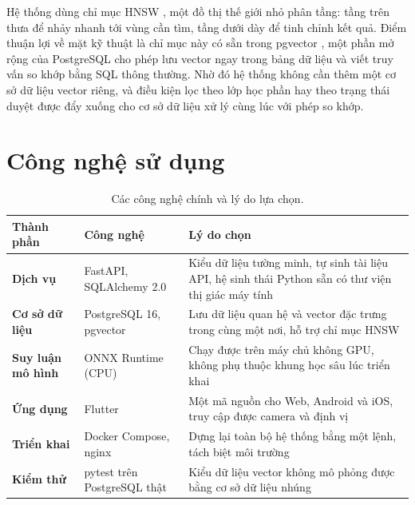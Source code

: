 Hệ thống dùng chỉ mục HNSW \cite{Malkov2020HNSW}, một đồ thị thế giới nhỏ
phân tầng: tầng trên thưa để nhảy nhanh tới vùng cần tìm, tầng dưới dày để
tinh chỉnh kết quả. Điểm thuận lợi về mặt kỹ thuật là chỉ mục này có sẵn
trong pgvector \cite{Pgvector2024}, một phần mở rộng của PostgreSQL cho phép
lưu vector ngay trong bảng dữ liệu và viết truy vấn so khớp bằng SQL thông
thường. Nhờ đó hệ thống không cần thêm một cơ sở dữ liệu vector riêng, và
điều kiện lọc theo lớp học phần hay theo trạng thái duyệt được đẩy xuống cho
cơ sở dữ liệu xử lý cùng lúc với phép so khớp.

\section{Công nghệ sử dụng}

\begin{table}[H]
\centering
\caption{Các công nghệ chính và lý do lựa chọn.}
\label{tab:congnghe}
\small
\begin{tabularx}{\textwidth}{@{}>{\bfseries}l >{\raggedright\arraybackslash}p{3.1cm} X@{}}
\toprule
Thành phần & Công nghệ & Lý do chọn \\
\midrule
Dịch vụ & FastAPI, SQLAlchemy 2.0 & Kiểu dữ liệu tường minh, tự sinh tài liệu
  API, hệ sinh thái Python sẵn có thư viện thị giác máy tính \\
Cơ sở dữ liệu & PostgreSQL 16, pgvector \cite{Pgvector2024} & Lưu dữ liệu quan hệ và vector đặc
  trưng trong cùng một nơi, hỗ trợ chỉ mục HNSW \\
Suy luận mô hình & ONNX Runtime (CPU) & Chạy được trên máy chủ không GPU,
  không phụ thuộc khung học sâu lúc triển khai \\
Ứng dụng & Flutter & Một mã nguồn cho Web, Android và iOS, truy cập được
  camera và định vị \\
Triển khai & Docker Compose, nginx & Dựng lại toàn bộ hệ thống bằng một
  lệnh, tách biệt môi trường \\
Kiểm thử & pytest trên PostgreSQL thật & Kiểu dữ liệu vector không mô phỏng
  được bằng cơ sở dữ liệu nhúng \\
\bottomrule
\end{tabularx}
\end{table}

